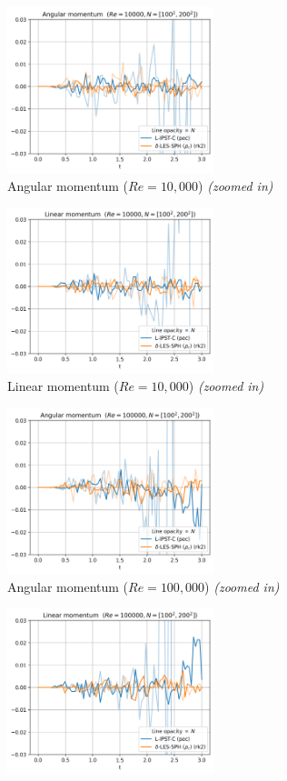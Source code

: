 \begin{figure}[htbp!]
  \begin{subfigure}{7cm}
  \centering\includegraphics[width=6cm]{Code-Figures/ext-force-tgv/limit_am_re_10000.png}
  \caption{Angular momentum ($Re = 10,000$) \textit{(zoomed in)}}
  \end{subfigure}
  \begin{subfigure}{7cm}
  \centering\includegraphics[width=6cm]{Code-Figures/ext-force-tgv/limit_lm_re_10000.png}
  \caption{Linear momentum ($Re = 10,000$) \textit{(zoomed in)}}
  \end{subfigure}
  \begin{subfigure}{7cm}
  \centering\includegraphics[width=6cm]{Code-Figures/ext-force-tgv/limit_am_re_100000.png}
  \caption{Angular momentum ($Re = 100,000$) \textit{(zoomed in)}}
  \end{subfigure}
  \begin{subfigure}{7cm}
  \centering\includegraphics[width=6cm]{Code-Figures/ext-force-tgv/limit_lm_re_100000.png}

\end{subfigure}
\end{figure}
